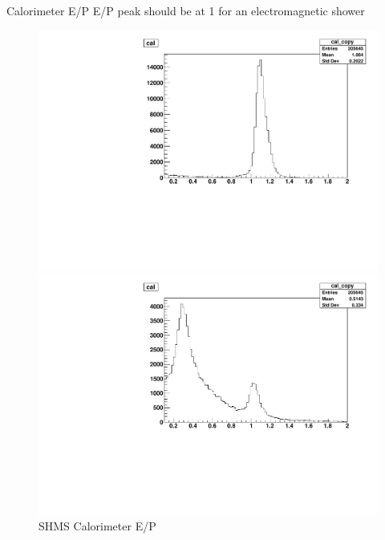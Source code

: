 \documentclass[aspectratio=169,xcolor=dvipsnames]{beamer}
\begin{document}
\begin{frame}{Calorimeter E/P}
  E/P peak should be at 1 for an electromagnetic shower
  \begin{figure}
    \centering
    \begin{minipage}[b]{0.4\textwidth}
      \includegraphics[width=\textwidth]{hms_eoverp.pdf}
      \caption{HMS Calorimeter E/P}
    \end{minipage}
  \hfill
  \begin{minipage}[b]{0.4\textwidth}
    \includegraphics[width=\textwidth]{shms_eoverp.pdf}
    \caption{SHMS Calorimeter E/P}
  \end{minipage}
\end{figure}{}
\end{frame}{}
\end{document}
